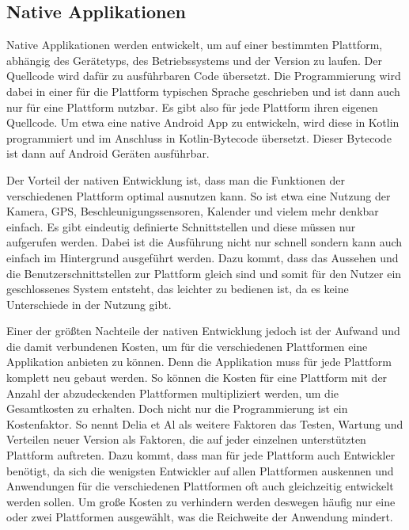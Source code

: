 \subsection{Native Applikationen}
Native Applikationen werden entwickelt, um auf einer bestimmten Plattform, abhängig des Gerätetyps, des Betriebssystems und der Version zu laufen. Der Quellcode wird dafür zu ausführbaren Code übersetzt.\cite{IEEE_development_classes}
Die Programmierung wird dabei in einer für die Plattform typischen Sprache geschrieben und ist dann auch nur für eine Plattform nutzbar. Es gibt also für jede Plattform ihren eigenen Quellcode. Um etwa eine native Android App zu entwickeln, wird diese in Kotlin programmiert und im Anschluss in Kotlin-Bytecode übersetzt. Dieser Bytecode ist dann auf Android Geräten ausführbar.

Der Vorteil der nativen Entwicklung ist, dass man die Funktionen der verschiedenen Plattform optimal ausnutzen kann. So ist etwa eine Nutzung der Kamera, GPS, Beschleunigungssensoren, Kalender und vielem mehr denkbar einfach. Es gibt eindeutig definierte Schnittstellen und diese müssen nur aufgerufen werden. Dabei ist die Ausführung nicht nur schnell sondern kann auch einfach im Hintergrund ausgeführt werden.\cite{IEEE_development_classes} Dazu kommt, dass das Aussehen und die Benutzerschnittstellen zur Plattform gleich sind und somit für den Nutzer ein geschlossenes System entsteht, das leichter zu bedienen ist, da es keine Unterschiede in der Nutzung gibt. \cite{IEEE_Khackouch_Al}

Einer der größten Nachteile der nativen Entwicklung jedoch ist der Aufwand und die damit verbundenen Kosten, um für die verschiedenen Plattformen eine Applikation anbieten zu können. Denn die Applikation muss für jede Plattform komplett neu gebaut werden. So können die Kosten für eine Plattform mit der Anzahl der abzudeckenden Plattformen multipliziert werden, um die Gesamtkosten zu erhalten.\cite{IEEE_Khackouch_Al} Doch nicht nur die Programmierung ist ein Kostenfaktor. So nennt Delia et Al als weitere Faktoren das Testen, Wartung und Verteilen neuer Version als Faktoren, die auf jeder einzelnen unterstützten Plattform auftreten.\cite{IEEE_development_classes} Dazu kommt, dass man für jede Plattform auch Entwickler benötigt, da sich die wenigsten Entwickler auf allen Plattformen auskennen und Anwendungen für die verschiedenen Plattformen oft auch gleichzeitig entwickelt werden sollen. Um große Kosten zu verhindern werden deswegen häufig nur  eine oder zwei Plattformen ausgewählt, was die Reichweite der Anwendung mindert.


